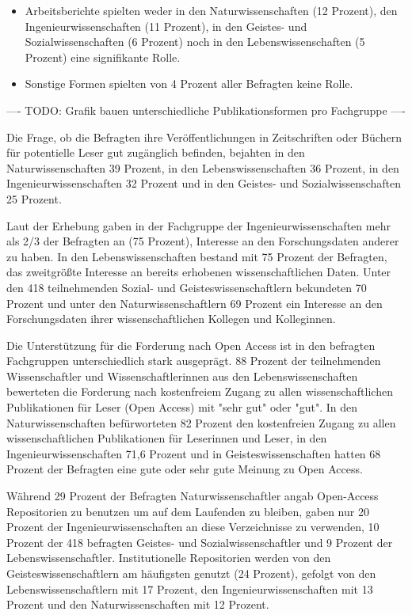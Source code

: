 \begin{itemize}
 \item  Arbeitsberichte spielten weder in den Naturwissenschaften (12 Prozent), den Ingenieurwissenschaften (11 Prozent), in den Geistes- und Sozialwissenschaften (6 Prozent) noch in den Lebenswissenschaften (5 Prozent) eine signifikante Rolle.
 \item Sonstige Formen spielten von 4 Prozent aller Befragten keine Rolle.
 \end{itemize}

---- TODO: Grafik bauen unterschiedliche Publikationsformen pro Fachgruppe ----

Die Frage, ob die Befragten ihre Veröffentlichungen in Zeitschriften oder Büchern für potentielle Leser gut zugänglich befinden, bejahten in den Naturwissenschaften 39 Prozent, in den Lebenswissenschaften 36 Prozent, in den Ingenieurwissenschaften 32 Prozent und in den Geistes- und Sozialwissenschaften 25 Prozent.

Laut der Erhebung gaben in der Fachgruppe der Ingenieurwissenschaften mehr als 2/3 der Befragten an (75 Prozent), Interesse an den Forschungsdaten anderer zu haben. In den Lebenswissenschaften bestand mit 75 Prozent der Befragten, das zweitgrößte Interesse an bereits erhobenen wissenschaftlichen Daten. Unter den 418 teilnehmenden Sozial- und Geisteswissenschaftlern bekundeten 70 Prozent und unter den Naturwissenschaftlern 69 Prozent ein Interesse an den Forschungsdaten ihrer wissenschaftlichen Kollegen und Kolleginnen.

Die Unterstützung für die Forderung nach Open Access ist in den befragten Fachgruppen unterschiedlich stark ausgeprägt. 88 Prozent der teilnehmenden Wissenschaftler und Wissenschaftlerinnen aus den Lebenswissenschaften bewerteten die Forderung nach kostenfreiem Zugang zu allen wissenschaftlichen Publikationen für Leser (Open Access) mit "sehr gut" oder "gut". In den Naturwissenschaften befürworteten 82 Prozent den kostenfreien Zugang zu allen wissenschaftlichen Publikationen für Leserinnen und Leser, in den Ingenieurwissenschaften 71,6 Prozent und in Geisteswissenschaften hatten 68 Prozent der Befragten eine gute oder sehr gute Meinung zu Open Access.

Während 29 Prozent der Befragten Naturwissenschaftler angab Open-Access Repositorien zu benutzen um auf dem Laufenden zu bleiben, gaben nur 20 Prozent der Ingenieurwissenschaften an diese Verzeichnisse zu verwenden, 10 Prozent der 418 befragten Geistes- und Sozialwissenschaftler und 9 Prozent der Lebenswissenschaftler. Institutionelle Repositorien werden von den Geisteswissenschaftlern am häufigsten genutzt (24 Prozent), gefolgt von den Lebenswissenschaftlern mit 17 Prozent, den Ingenieurwissenschaften  mit 13 Prozent und den Naturwissenschaften mit 12 Prozent.

